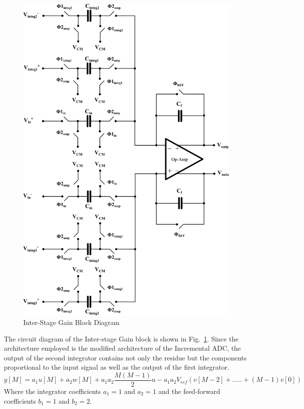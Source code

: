 \begin{figure}[h!]
\hspace{1in}
\includegraphics[width=0.7\columnwidth]{Chap05/Figures/ISG.png}
\caption{Inter-Stage Gain Block Diagram}
\label{fig:ISG}
\end{figure}

The circuit diagram of the Inter-stage Gain block is shown in Fig.~\ref{fig:ISG}. Since the architecture employed is the modified architecture of the Incremental ADC, the output of the second integrator contains not only the residue but the components proportional to the input signal as well as the output of the first integrator.
%
\begin{equation*}
        y[M]=a_1u[M]+a_2w[M]+a_1a_2\frac{M(M-1)}{2}u-a_1a_2V_{ref}\left(v[M-2]+.....+(M-1)v[0]\right)
\end{equation*}
%
Where the integrator coefficients $a_1=1$ and $a_2=1$ and the feed-forward coefficients $b_1=1$ and $b_2=2$. 

